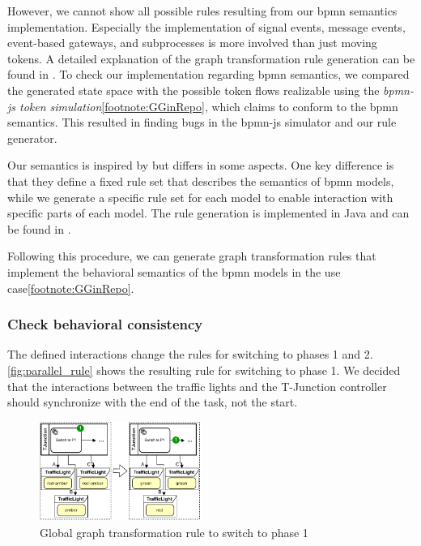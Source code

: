 \documentclass{jot}
\begin{document}
However, we cannot show all possible rules resulting from our \gls*{bpmn} semantics implementation.
Especially the implementation of signal events, message events, event-based gateways, and subprocesses is more involved than just moving tokens.
A detailed explanation of the graph transformation rule generation can be found in \cite{krauterFormalizationAnalysisBPMN2022}.
To check our implementation regarding \gls*{bpmn} semantics, we compared the generated state space with the possible token flows realizable using the \emph{bpmn-js token simulation}\cref{footnote:GGinRepo}, which claims to conform to the \gls*{bpmn} semantics.
This resulted in finding bugs in the bpmn-js simulator and our rule generator.

Our semantics is inspired by \cite{vangorpVisualTokenbasedFormalization2013} but differs in some aspects.
One key difference is that they define a fixed rule set that describes the semantics of \gls*{bpmn} models, while we generate a specific rule set for each model to enable interaction with specific parts of each model.
The rule generation is implemented in Java and can be found in \cite{krauterRewriteRuleGeneration2022}.

Following this procedure, we can generate graph transformation rules that implement the behavioral semantics of the \gls*{bpmn} models in the use case\cref{footnote:GGinRepo}.

\subsubsection{Check behavioral consistency}
The defined interactions change the rules for switching to phases 1 and 2.
\autoref{fig:parallel_rule} shows the resulting rule for switching to phase 1.
We decided that the interactions between the traffic lights and the T-Junction controller should synchronize with the end of the task, not the start.

\begin{figure}[h]
    \centering
    \includegraphics[width=0.475\textwidth]{figures/parallel_rule.pdf}
    \caption{Global graph transformation rule to switch to phase 1}
    \label{fig:parallel_rule}
\end{figure}
\end{document}
